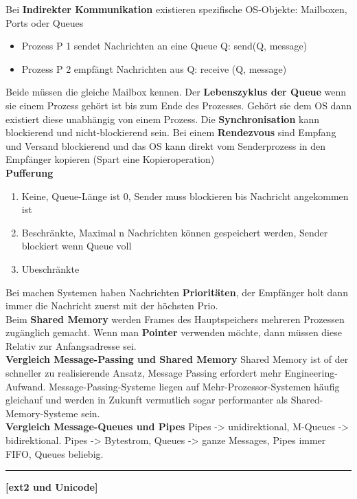 \documentclass[8pt]{extarticle}
\let\oldtextbf\textbf
\renewcommand{\textbf}{\tiny\oldtextbf}
\begin{document}
\begin{multicols*}{5}
	Bei \textbf{Indirekter Kommunikation} existieren spezifische OS-Objekte: Mailboxen, Ports oder Queues
	\begin{itemize} [noitemsep, topsep=0pt, leftmargin=*]
		\item Prozess P 1 sendet Nachrichten an eine Queue Q: send(Q, message)
		\item Prozess P 2 empfängt Nachrichten aus Q: receive (Q, message)
	\end{itemize} Beide müssen die gleiche Mailbox kennen. Der \textbf{Lebenszyklus der Queue} wenn sie einem Prozess gehört ist bis zum Ende des Prozesses. Gehört sie dem OS dann existiert diese unabhängig von einem Prozess. Die \textbf{Synchronisation} kann blockierend und nicht-blockierend sein. Bei einem \textbf{Rendezvous} sind Empfang und Versand blockierend und das OS kann direkt vom Senderprozess in den Empfänger kopieren (Spart eine Kopieroperation)\\
	\textbf{Pufferung}
	\begin{enumerate} [noitemsep, topsep=0pt, leftmargin=*]
		\item Keine, Queue-Länge ist 0, Sender muss blockieren bis Nachricht angekommen ist
		\item Beschränkte, Maximal n Nachrichten können gespeichert werden, Sender blockiert wenn Queue voll
		\item Ubeschränkte
	\end{enumerate}
	Bei machen Systemen haben Nachrichten \textbf{Prioritäten}, der Empfänger holt dann immer die Nachricht zuerst mit der höchsten Prio.\\
	
	Beim \textbf{Shared Memory} werden Frames des Hauptspeichers mehreren Prozessen zugänglich gemacht. Wenn man \textbf{Pointer} verwenden möchte, dann müssen diese Relativ zur Anfangsadresse sei.\\
	
	\textbf{Vergleich Message-Passing und Shared Memory} Shared Memory ist of der schneller zu realisierende Ansatz, Message Passing erfordert mehr Engineering-Aufwand. Message-Passing-Systeme liegen auf Mehr-Prozessor-Systemen häufig gleichauf und werden in Zukunft vermutlich sogar performanter als Shared-Memory-Systeme sein.\\
	
	\textbf{Vergleich Message-Queues und Pipes} Pipes -> unidirektional, M-Queues -> bidirektional. Pipes -> Bytestrom, Queues -> ganze Messages, Pipes immer FIFO, Queues beliebig.
	
	
	\vspace{5pt}
	\rule{\linewidth}{0.4pt}
	\textbf{[ext2 und Unicode]}\\
	

\end{multicols*}
\end{document}
